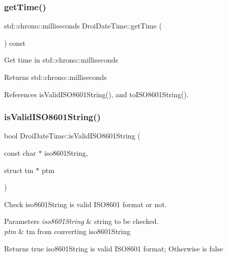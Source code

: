 \subsubsection{\texorpdfstring{get\+Time()}{getTime()}}
{\footnotesize\ttfamily std\+::chrono\+::milliseconds Droi\+Date\+Time\+::get\+Time (\begin{DoxyParamCaption}{ }\end{DoxyParamCaption}) const\hspace{0.3cm}{\ttfamily [inline]}}

Get time in std\+::chrono\+::milliseconds \begin{DoxyReturn}{Returns}
std\+::chrono\+::milliseconds 
\end{DoxyReturn}


References is\+Valid\+I\+S\+O8601\+String(), and to\+I\+S\+O8601\+String().

\mbox{\label{class_droi_date_time_a49d981c3055e4bd519e5b3333cd21d7a}} 
\subsubsection{\texorpdfstring{is\+Valid\+I\+S\+O8601\+String()}{isValidISO8601String()}\hspace{0.1cm}{\footnotesize\ttfamily [1/2]}}
{\footnotesize\ttfamily bool Droi\+Date\+Time\+::is\+Valid\+I\+S\+O8601\+String (\begin{DoxyParamCaption}\item[{const char $\ast$}]{iso8601\+String,  }\item[{struct tm $\ast$}]{ptm }\end{DoxyParamCaption})\hspace{0.3cm}{\ttfamily [static]}}

Check iso8601\+String is valid I\+S\+O8601 format or not. 
\begin{DoxyParams}{Parameters}
{\em iso8601\+String} & string to be checked. \\
\hline
{\em ptm} & tm from converting iso8601\+String \\
\hline
\end{DoxyParams}
\begin{DoxyReturn}{Returns}
true iso8601\+String is valid I\+S\+O8601 format; Otherwise is false 
\end{DoxyReturn}


